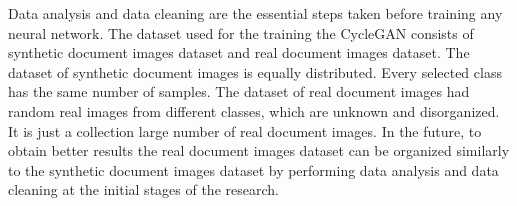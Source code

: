 Data analysis and data cleaning are the essential steps taken before training any neural network. The dataset used for the training the \ac{CycleGAN} consists of synthetic document images dataset and real document images dataset. The dataset of synthetic document images is equally distributed. Every selected class has the same number of samples. The dataset of real document images had random real images from different classes, which are unknown and disorganized. It is just a collection large number of real document images. In the future, to obtain better results the real document images dataset can be organized similarly to the synthetic document images dataset by performing data analysis and data cleaning at the initial stages of the research.





























